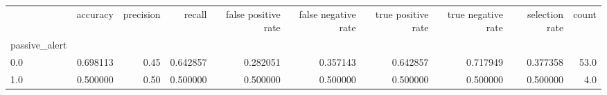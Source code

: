 \begin{tabular}{lrrrrrrrrr}
\toprule
{} &  accuracy &  precision &    recall &  false positive rate &  false negative rate &  true positive rate &  true negative rate &  selection rate &  count \\
passive\_alert &           &            &           &                      &                      &                     &                     &                 &        \\
\midrule
0.0           &  0.698113 &       0.45 &  0.642857 &             0.282051 &             0.357143 &            0.642857 &            0.717949 &        0.377358 &   53.0 \\
1.0           &  0.500000 &       0.50 &  0.500000 &             0.500000 &             0.500000 &            0.500000 &            0.500000 &        0.500000 &    4.0 \\
\bottomrule
\end{tabular}
